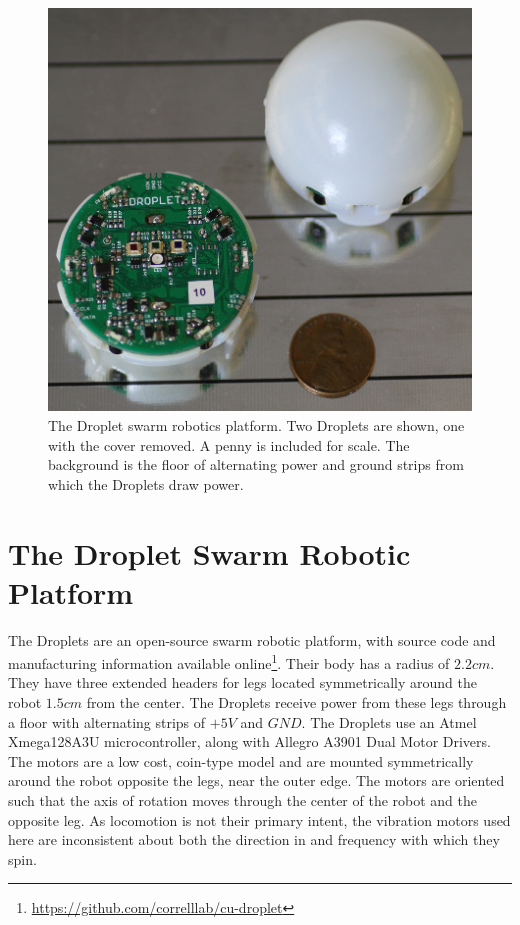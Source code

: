\documentclass[letterpaper, 10pt, conference]{ieeeconf}
\begin{document}
\begin{figure}[h]
	\centering
		\includegraphics[width=0.8\columnwidth]{./Images/droplets.png}
	\caption{The Droplet swarm robotics platform. Two Droplets are shown, one with the cover removed. A penny is included for scale. The background is the floor of alternating power and ground strips from which the Droplets draw power.}
	\label{droplets}
\end{figure}


\section{The Droplet Swarm Robotic Platform}
The Droplets are an open-source swarm robotic platform, with source code and manufacturing information available online\footnote{\url{https://github.com/correlllab/cu-droplet}}. Their body has a radius of $2.2cm$. They have three extended headers for legs located symmetrically around the robot $1.5cm$ from the center. The Droplets receive power from these legs through a floor with alternating strips of $+5V$ and $GND$. The Droplets use an Atmel Xmega128A3U microcontroller, along with Allegro A3901 Dual Motor Drivers. The motors are a low cost, coin-type model and are mounted symmetrically around the robot opposite the legs, near the outer edge. The motors are oriented such that the axis of rotation moves through the center of the robot and the opposite leg. As locomotion is not their primary intent, the vibration motors used here are inconsistent about both the direction in and frequency with which they spin.
\end{document}
